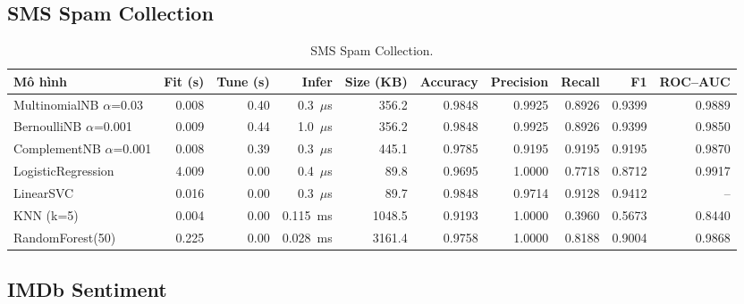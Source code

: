 \documentclass[11pt,a4paper]{article}
\begin{document}
\subsection{SMS Spam Collection}

\begin{table}[H]
\centering
\small
\caption{SMS Spam Collection.}
\label{tab:bench-sms}
\footnotesize
\setlength{\tabcolsep}{3.5pt}
\begin{tabular}{@{}lrrrrrrrrr@{}}
\toprule
\textbf{Mô hình} & \textbf{Fit (s)} & \textbf{Tune (s)} & \textbf{Infer} & \textbf{Size (KB)} & \textbf{Accuracy} & \textbf{Precision} & \textbf{Recall} & \textbf{F1} & \textbf{ROC--AUC} \\
\midrule
MultinomialNB $\alpha$=0.03 & 0.008 & 0.40 & 0.3~$\mu$s & 356.2 & 0.9848 & 0.9925 & 0.8926 & 0.9399 & 0.9889 \\
BernoulliNB $\alpha$=0.001 & 0.009 & 0.44 & 1.0~$\mu$s & 356.2 & 0.9848 & 0.9925 & 0.8926 & 0.9399 & 0.9850 \\
ComplementNB $\alpha$=0.001 & 0.008 & 0.39 & 0.3~$\mu$s & 445.1 & 0.9785 & 0.9195 & 0.9195 & 0.9195 & 0.9870 \\
LogisticRegression & 4.009 & 0.00 & 0.4~$\mu$s & 89.8 & 0.9695 & 1.0000 & 0.7718 & 0.8712 & 0.9917 \\
LinearSVC & 0.016 & 0.00 & 0.3~$\mu$s & 89.7 & 0.9848 & 0.9714 & 0.9128 & 0.9412 & -- \\
KNN (k=5) & 0.004 & 0.00 & 0.115~ms & 1048.5 & 0.9193 & 1.0000 & 0.3960 & 0.5673 & 0.8440 \\
RandomForest(50) & 0.225 & 0.00 & 0.028~ms & 3161.4 & 0.9758 & 1.0000 & 0.8188 & 0.9004 & 0.9868 \\
\bottomrule
\end{tabular}
\end{table}

\subsection{IMDb Sentiment}
\end{document}
